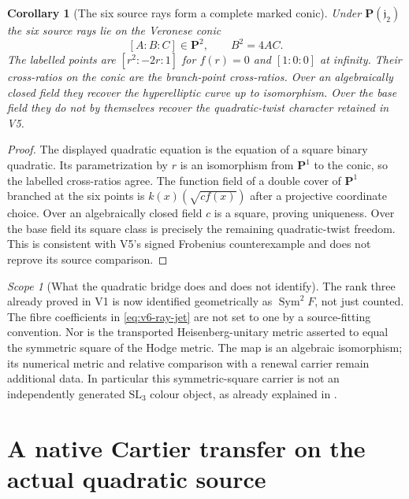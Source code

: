 \documentclass[11pt]{article}
\newtheorem{corollary}[corollary]{Corollary}
\theoremstyle{definition}
\theoremstyle{remark}
\newtheorem{scope}[scope]{Scope}
\begin{document}
\begin{corollary}[The six source rays form a complete marked conic]
\label{cor:v6-conic}
Under $\mathbf P(\mathfrak j_2)$ the six source rays lie on the Veronese conic
\begin{equation}
 \boxed{[A:B:C]\in\mathbf P^2,\qquad B^2=4AC.}
 \label{eq:v6-conic}
\end{equation}
The labelled points are
$[r^2:-2r:1]$ for $f(r)=0$ and $[1:0:0]$ at infinity.
Their cross-ratios on the conic are the branch-point cross-ratios.
Over an algebraically closed field they recover the hyperelliptic curve
up to isomorphism. Over the base field they do not by themselves recover
the quadratic-twist character retained in V5.
\end{corollary}
\begin{proof}
The displayed quadratic equation is the equation of a square binary
quadratic. Its parametrization by $r$ is an isomorphism from
$\mathbf P^1$ to the conic, so the labelled cross-ratios agree.
The function field of a double cover of $\mathbf P^1$ branched at the
six points is $k(x)(\sqrt{c f(x)})$ after a projective coordinate
choice. Over an algebraically closed field $c$ is a square, proving
uniqueness. Over the base field its square class is precisely the
remaining quadratic-twist freedom. This is consistent with V5's signed
Frobenius counterexample and does not reprove its source comparison.
\end{proof}

\begin{scope}[What the quadratic bridge does and does not identify]
The rank three already proved in V1 is now identified geometrically as
$\operatorname{Sym}^2F$, not just counted. The fibre coefficients in
\eqref{eq:v6-ray-jet} are not set to one by a source-fitting convention.
Nor is the transported Heisenberg-unitary metric asserted to equal the
symmetric square of the Hodge metric. The map is an algebraic isomorphism;
its numerical metric and relative comparison with a renewal carrier
remain additional data. In particular this symmetric-square carrier is
not an independently generated $\mathrm{SL}_3$ colour object, as already
explained in \cite{AD9}.
\end{scope}

\section{A native Cartier transfer on the actual quadratic source}
\label{sec:v6-Cartier}
\end{document}
